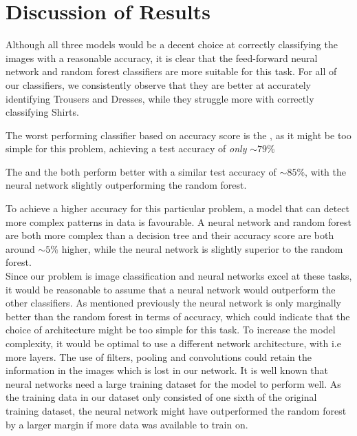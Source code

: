 \section{Discussion of Results}
Although all three models would be a decent choice at correctly classifying the images with a reasonable accuracy, it is clear that the feed-forward neural network and random forest classifiers are more suitable for this task.
For all of our classifiers, we consistently observe that they are better at accurately identifying Trousers and Dresses, while they struggle more with correctly classifying Shirts.
\newline

The worst performing classifier based on accuracy score is the , as it might be too simple for this problem, achieving a test accuracy of \textit{only} $\sim79\%$
\newline

The  and the  both perform better with a similar test accuracy of $\sim85\%$, with the neural network slightly outperforming the random forest.
\newline

To achieve a higher accuracy for this particular problem, a model that can detect more complex patterns in data is favourable.
A neural network and random forest are both more complex than a decision tree and their accuracy score are both around $\sim5\%$ higher,
while the neural network is slightly superior to the random forest. \\

Since our problem is image classification and neural networks excel at these tasks, it would be reasonable to assume that a neural network would outperform the other classifiers.
As mentioned previously the neural network is only marginally better than the random forest in terms of accuracy, which could indicate that the choice of architecture might be too simple for this task.
To increase the model complexity, it would be optimal to use a different network architecture, with i.e more layers.
The use of filters, pooling and convolutions could retain the information in the images which is lost in our network.
It is well known that neural networks need a large training dataset for the model to perform well.
As the training data in our dataset only consisted of one sixth of the original training dataset,
the neural network might have outperformed the random forest by a larger margin if more data was available to train on.


